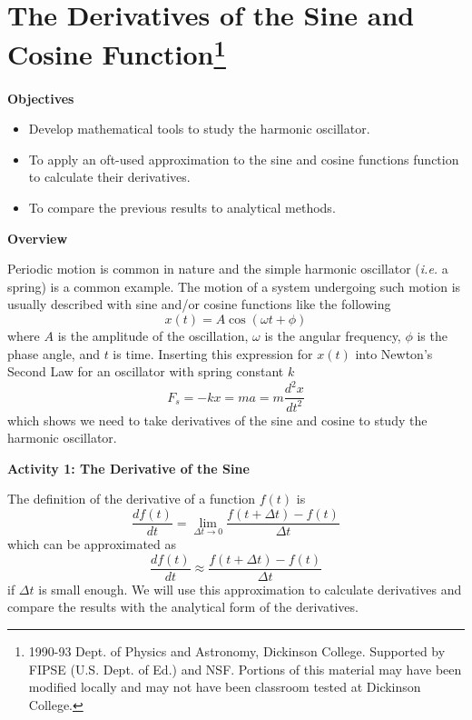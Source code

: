 
\section{The Derivatives of the Sine and Cosine Function\footnote{
1990-93 Dept. of Physics and Astronomy, Dickinson College. Supported by FIPSE
(U.S. Dept. of Ed.) and NSF. Portions of this material may have been modified
locally and may not have been classroom tested at Dickinson College.
}}

\makelabheader %

\medskip
\textbf{Objectives }

\begin{itemize}[nosep]
\item Develop mathematical tools to study the harmonic oscillator.
\item To apply an oft-used approximation to the sine and cosine functions function to calculate their derivatives.
\item To compare the previous results to analytical methods.
\end{itemize}
\textbf{Overview }

Periodic motion is common in nature and the simple harmonic oscillator ({\it i.e.} a spring) is
a common example.
The motion of a system undergoing such motion is usually described with sine
and/or cosine functions like the following
\begin{equation}
x(t) = A\cos(\omega t + \phi)
\end{equation}
where $A$ is the amplitude of the oscillation, $\omega$ is the angular frequency, $\phi$ is the
phase angle, and $t$ is time.
Inserting this expression for $x(t)$ into Newton's Second Law for an oscillator
with spring constant $k$
\begin{equation}
F_s = -kx = ma = m\frac{d^2x}{dt^2}
\end{equation}
which shows we need to take derivatives of the sine and cosine to study the harmonic oscillator.

\textbf{Activity 1: The Derivative of the Sine} 

The definition of the derivative of a function $f(t)$ is 
\begin{equation}
\frac{d f(t)}{dt} = \lim_{\Delta t \rightarrow 0} \frac{f(t+\Delta t) - f(t)}{\Delta t}
\end{equation}
which can be approximated as
\begin{equation}
\frac{d f(t)}{dt} \approx \frac{f(t+\Delta t) - f(t)}{\Delta t}
\end{equation}\label{eq:approx}
if $\Delta t$ is small enough.
We will use this approximation to calculate derivatives and compare the results
with the analytical form of the derivatives.

